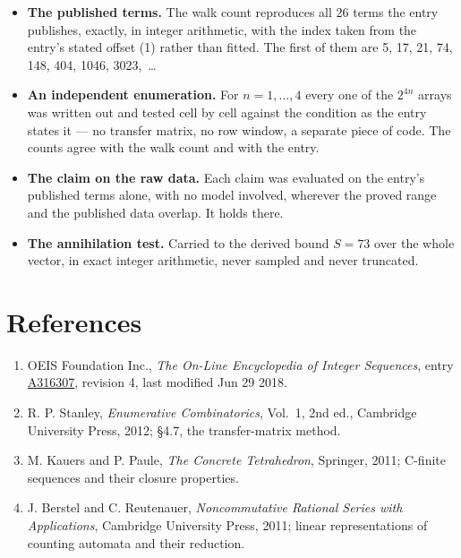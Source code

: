 \documentclass[11pt]{article}
\theoremstyle{definition}
\begin{document}
\begin{itemize}

\item {\bfseries The published terms.} The walk count reproduces all 26 terms the entry publishes, exactly, in integer arithmetic, with the index taken from the entry's stated offset (1) rather than fitted. The first of them are 5, 17, 21, 74, 148, 404, 1046, 3023,~\dots

\item {\bfseries An independent enumeration.} For $n = 1,\dots,4$ every one of the $2^{4n}$ arrays was written out and tested cell by cell against the condition as the entry states it --- no transfer matrix, no row window, a separate piece of code. The counts agree with the walk count and with the entry.

\item {\bfseries The claim on the raw data.} Each claim was evaluated on the entry's published terms alone, with no model involved, wherever the proved range and the published data overlap. It holds there.

\item {\bfseries The annihilation test.} Carried to the derived bound $S = 73$ over the whole vector, in exact integer arithmetic, never sampled and never truncated.

\end{itemize}

\section{References}

\begin{enumerate}

\item OEIS Foundation Inc., \emph{The On-Line Encyclopedia of Integer Sequences}, entry \href{https://oeis.org/A316307}{A316307}, revision 4, last modified Jun 29 2018.

\item R. P. Stanley, \emph{Enumerative Combinatorics}, Vol.~1, 2nd ed., Cambridge University Press, 2012; \S4.7, the transfer-matrix method.

\item M. Kauers and P. Paule, \emph{The Concrete Tetrahedron}, Springer, 2011; C-finite sequences and their closure properties.

\item J. Berstel and C. Reutenauer, \emph{Noncommutative Rational Series with Applications}, Cambridge University Press, 2011; linear representations of counting automata and their reduction.

\end{enumerate}
\end{document}
